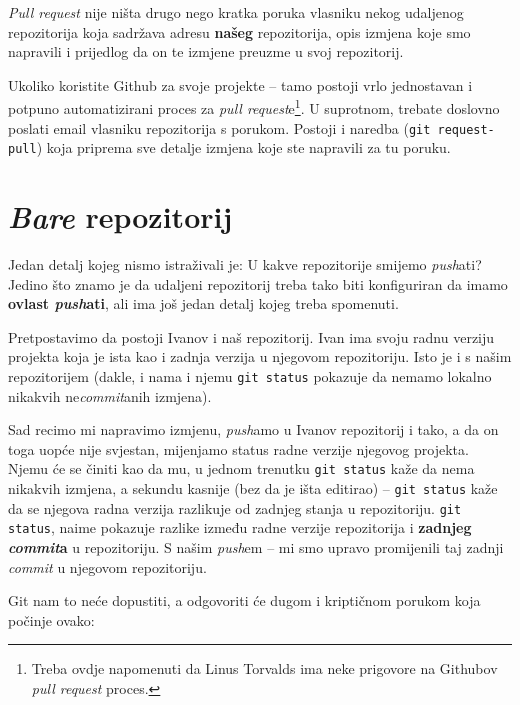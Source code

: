 \emph{Pull request} nije ništa drugo nego kratka poruka vlasniku nekog udaljenog repozitorija koja sadržava adresu \textbf{našeg} repozitorija, opis izmjena koje smo napravili i prijedlog da on te izmjene preuzme u svoj repozitorij.

Ukoliko koristite Github za svoje projekte -- tamo postoji vrlo jednostavan i potpuno automatizirani proces za \emph{pull request}e\footnote{Treba ovdje napomenuti da Linus Torvalds ima neke prigovore na Githubov \emph{pull request} proces.}.
U suprotnom, trebate doslovno poslati email vlasniku repozitorija s porukom.
Postoji i naredba (\verb+git request-pull+) koja priprema sve detalje izmjena koje ste napravili za tu poruku.

\section*{\emph{Bare} repozitorij}

Jedan detalj kojeg nismo istraživali je: U kakve repozitorije smijemo \emph{push}ati? 
Jedino što znamo je da udaljeni repozitorij treba tako biti konfiguriran da imamo \textbf{ovlast \emph{push}ati}, ali ima još jedan detalj kojeg treba spomenuti.

Pretpostavimo da postoji Ivanov i naš repozitorij.
Ivan ima svoju radnu verziju projekta koja je ista kao i zadnja verzija u njegovom repozitoriju.
Isto je i s našim repozitorijem (dakle, i nama i njemu \verb+git status+ pokazuje da nemamo lokalno nikakvih ne\emph{commit}anih izmjena).

Sad recimo mi napravimo izmjenu, \emph{push}amo u Ivanov repozitorij i tako, a da on toga uopće nije svjestan, mijenjamo status radne verzije njegovog projekta.
Njemu će se činiti kao da mu, u jednom trenutku \verb+git status+ kaže da nema nikakvih izmjena, a sekundu kasnije (bez da je išta editirao) -- \verb+git status+ kaže da se njegova radna verzija razlikuje od zadnjeg stanja u repozitoriju.
\verb+git status+, naime pokazuje razlike između radne verzije repozitorija i \textbf{zadnjeg \emph{commit}a} u repozitoriju.
S našim \emph{push}em -- mi smo upravo promijenili taj zadnji \emph{commit} u njegovom repozitoriju.

Git nam to neće dopustiti, a odgovoriti će dugom i kriptičnom porukom koja počinje ovako:


